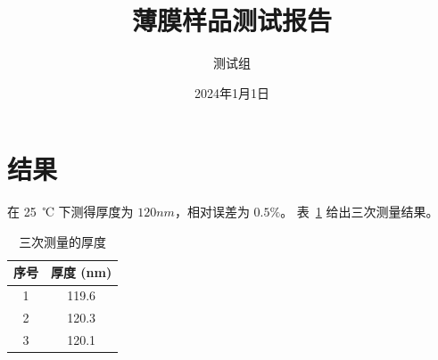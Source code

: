 \documentclass[UTF8,fontset=fandol]{ctexart}
\title{薄膜样品测试报告}
\author{测试组}
\date{2024年1月1日}
\begin{document}
\maketitle

\section{结果}
在 25~℃ 下测得厚度为 $120 nm$，相对误差为 $0.5\%$。
表~\ref{tab:res} 给出三次测量结果。

\begin{table}[htbp]
  \centering
  \caption{三次测量的厚度}
  \label{tab:res}
  \begin{tabular}{cc}
    \toprule
    序号 & 厚度 (nm) \\
    \midrule
    1 & 119.6 \\
    2 & 120.3 \\
    3 & 120.1 \\
    \bottomrule
  \end{tabular}
\end{table}
\end{document}
